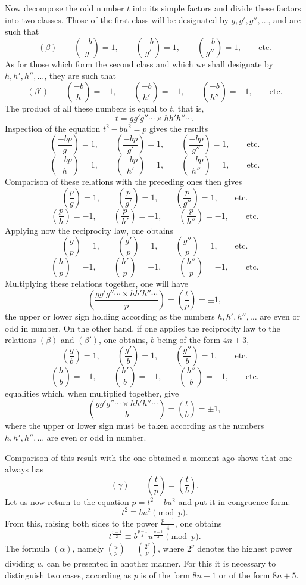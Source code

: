 \documentclass[11pt]{article}
\newcommand{\leg}[2]{\left(\frac{#1}{#2}\right)}
\newcommand{\unitid}[1]{\hypertarget{#1}{}}
\begin{document}
\unitid{dirichlet.v1.p04a.en.par.019}Now decompose the odd number $t$ into its simple factors and divide these factors into two classes. Those of the first class will be designated by $g,g',g'',\ldots$, and are such that
\[
(\beta)\qquad \leg{-b}{g}=1,
\qquad \leg{-b}{g'}=1,
\qquad \leg{-b}{g''}=1,
\qquad \text{etc.}
\]
As for those which form the second class and which we shall designate by $h,h',h'',\ldots$, they are such that
\[
(\beta')\qquad \leg{-b}{h}=-1,
\qquad \leg{-b}{h'}=-1,
\qquad \leg{-b}{h''}=-1,
\qquad \text{etc.}
\]
The product of all these numbers is equal to $t$, that is,
\[
 t=gg'g''\cdots\times hh'h''\cdots.
\]
Inspection of the equation $t^2-bu^2=p$ gives the results
\[
\leg{-bp}{g}=1,
\qquad \leg{-bp}{g'}=1,
\qquad \leg{-bp}{g''}=1,
\qquad \text{etc.}
\]
\[
\leg{-bp}{h}=1,
\qquad \leg{-bp}{h'}=1,
\qquad \leg{-bp}{h''}=1,
\qquad \text{etc.}
\]
Comparison of these relations with the preceding ones then gives
\[
\leg{p}{g}=1,
\qquad \leg{p}{g'}=1,
\qquad \leg{p}{g''}=1,
\qquad \text{etc.}
\]
\[
\leg{p}{h}=-1,
\qquad \leg{p}{h'}=-1,
\qquad \leg{p}{h''}=-1,
\qquad \text{etc.}
\]
Applying now the reciprocity law, one obtains
\[
\leg{g}{p}=1,
\qquad \leg{g'}{p}=1,
\qquad \leg{g''}{p}=1,
\qquad \text{etc.}
\]
\[
\leg{h}{p}=-1,
\qquad \leg{h'}{p}=-1,
\qquad \leg{h''}{p}=-1,
\qquad \text{etc.}
\]
Multiplying these relations together, one will have
\[
\leg{gg'g''\cdots\times hh'h''\cdots}{p}=\leg{t}{p}=\pm1,
\]
the upper or lower sign holding according as the numbers $h,h',h'',\ldots$ are even or odd in number. On the other hand, if one applies the reciprocity law to the relations $(\beta)$ and $(\beta')$, one obtains, $b$ being of the form $4n+3$,
\[
\leg{g}{b}=1,
\qquad \leg{g'}{b}=1,
\qquad \leg{g''}{b}=1,
\qquad \text{etc.}
\]
\[
\leg{h}{b}=-1,
\qquad \leg{h'}{b}=-1,
\qquad \leg{h''}{b}=-1,
\qquad \text{etc.}
\]
equalities which, when multiplied together, give
\[
 \leg{gg'g''\cdots\times hh'h''\cdots}{b}=\leg{t}{b}=\pm1,
\]
where the upper or lower sign must be taken according as the numbers $h,h',h'',\ldots$ are even or odd in number.

\unitid{dirichlet.v1.p04a.en.par.020}Comparison of this result with the one obtained a moment ago shows that one always has
\[
(\gamma)\qquad \leg{t}{p}=\leg{t}{b}.
\]
Let us now return to the equation $p=t^2-bu^2$ and put it in congruence form:
\[
 t^2\equiv bu^2\pmod p.
\]
From this, raising both sides to the power $\frac{p-1}{4}$, one obtains
\[
 t^{\frac{p-1}{2}}\equiv b^{\frac{p-1}{4}}u^{\frac{p-1}{2}}\pmod p.
\]
The formula $(\alpha)$, namely $\leg{u}{p}=\leg{2^\nu}{p}$, where $2^\nu$ denotes the highest power dividing $u$, can be presented in another manner. For this it is necessary to distinguish two cases, according as $p$ is of the form $8n+1$ or of the form $8n+5$.
\end{document}
